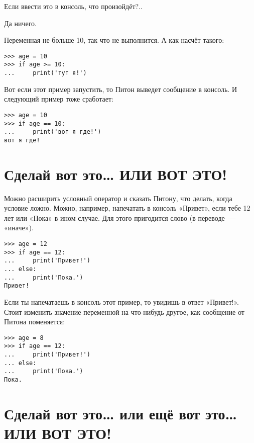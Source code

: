 Если ввести это в консоль, что произойдёт?..

Да ничего.

Переменная  не больше 10, так что  не выполнится. А как насчёт такого:

\begin{listing}
\begin{verbatim}
>>> age = 10
>>> if age >= 10:
...     print('тут я!')
\end{verbatim}
\end{listing}

Вот если этот пример запустить, то Питон выведет сообщение в консоль. И следующий пример тоже сработает:

\begin{listing}
\begin{verbatim}
>>> age = 10
>>> if age == 10:
...     print('вот я где!')
вот я где!
\end{verbatim}
\end{listing}

\section{Сделай вот это… ИЛИ ВОТ ЭТО!}

Можно расширить условный оператор и сказать Питону, что делать, когда условие ложно. Можно, например, напечатать в консоль «Привет», если тебе 12 лет или «Пока» в ином случае. Для этого пригодится слово  (в переводе — «иначе»).

\begin{listing}
\begin{verbatim}
>>> age = 12
>>> if age == 12:
...     print('Привет!')
... else:
...     print('Пока.')
Привет!
\end{verbatim}
\end{listing}

Если ты напечатаешь в консоль этот пример, то увидишь в ответ «Привет!». Стоит изменить значение переменной  на что-нибудь другое, как сообщение от Питона поменяется:

\begin{listing}
\begin{verbatim}
>>> age = 8
>>> if age == 12:
...     print('Привет!')
... else:
...     print('Пока.')
Пока.
\end{verbatim}
\end{listing}

\section{Сделай вот это… или ещё вот это… ИЛИ ВОТ ЭТО!}

